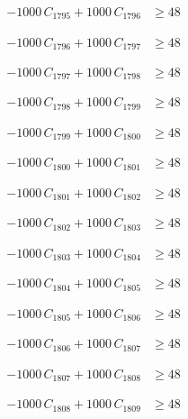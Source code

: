 \documentclass[a4paper,11pt]{article}
\begin{document}
\begin{align}
-1000\,C_{1795} + 1000\,C_{1796} &\geq 48 \nonumber
\end{align}

\begin{align}
-1000\,C_{1796} + 1000\,C_{1797} &\geq 48 \nonumber
\end{align}

\begin{align}
-1000\,C_{1797} + 1000\,C_{1798} &\geq 48 \nonumber
\end{align}

\begin{align}
-1000\,C_{1798} + 1000\,C_{1799} &\geq 48 \nonumber
\end{align}

\begin{align}
-1000\,C_{1799} + 1000\,C_{1800} &\geq 48 \nonumber
\end{align}

\begin{align}
-1000\,C_{1800} + 1000\,C_{1801} &\geq 48 \nonumber
\end{align}

\begin{align}
-1000\,C_{1801} + 1000\,C_{1802} &\geq 48 \nonumber
\end{align}

\begin{align}
-1000\,C_{1802} + 1000\,C_{1803} &\geq 48 \nonumber
\end{align}

\begin{align}
-1000\,C_{1803} + 1000\,C_{1804} &\geq 48 \nonumber
\end{align}

\begin{align}
-1000\,C_{1804} + 1000\,C_{1805} &\geq 48 \nonumber
\end{align}

\begin{align}
-1000\,C_{1805} + 1000\,C_{1806} &\geq 48 \nonumber
\end{align}

\begin{align}
-1000\,C_{1806} + 1000\,C_{1807} &\geq 48 \nonumber
\end{align}

\begin{align}
-1000\,C_{1807} + 1000\,C_{1808} &\geq 48 \nonumber
\end{align}

\begin{align}
-1000\,C_{1808} + 1000\,C_{1809} &\geq 48 \nonumber
\end{align}
\end{document}

